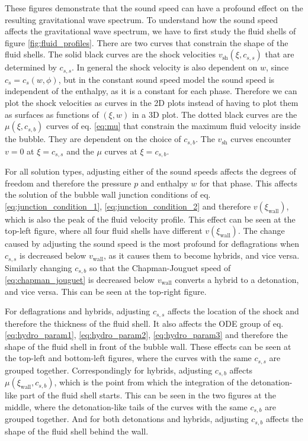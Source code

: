 These figures demonstrate that the sound speed can have a profound effect on the resulting gravitational wave spectrum.
To understand how the sound speed affects the gravitational wave spectrum,
we have to first study the fluid shells of figure \ref{fig:fluid_profiles}.
There are two curves that constrain the shape of the fluid shells.
The solid black curves are the shock velocities $v_\text{sh}(\xi,c_{s,s})$ that are determined by $c_{s,s}$.
In general the shock velocity is also dependent on $w$, since $c_s = c_s(w,\phi)$,
but in the constant sound speed model the sound speed is independent of the enthalpy,
as it is a constant for each phase.
Therefore we can plot the shock velocities as curves in the 2D plots instead of having to plot them as surfaces as functions of $(\xi,w)$ in a 3D plot.
The dotted black curves are the $\mu(\xi,c_{s,b})$ curves of eq. \eqref{eq:mu} that constrain the maximum fluid velocity inside the bubble.
They are dependent on the choice of $c_{s,b}$.
The $v_\text{sh}$ curves encounter $v=0$ at $\xi = c_{s,s}$ and the $\mu$ curves at $\xi = c_{s,b}$.

For all solution types, adjusting either of the sound speeds affects the degrees of freedom and therefore the pressure $p$ and enthalpy $w$ for that phase.
This affects the solution of the bubble wall junction conditions of eq. \eqref{eq:junction_condition_1}, \eqref{eq:junction_condition_2} and therefore $v(\xi_\text{wall})$,
which is also the peak of the fluid velocity profile.
This effect can be seen at the top-left figure, where all four fluid shells have different $v(\xi_\text{wall})$.
The change caused by adjusting the sound speed is the most profound for deflagrations when $c_{s,s}$ is decreased below $v_\text{wall}$, as it causes them to become hybrids, and vice versa.
Similarly changing $c_{s,b}$ so that the Chapman-Jouguet speed of \eqref{eq:chapman_jouguet} is decreased below $v_\text{wall}$ converts a hybrid to a detonation, and vice versa.
This can be seen at the top-right figure.

For deflagrations and hybrids, adjusting $c_{s,s}$ affects the location of the shock and therefore the thickness of the fluid shell.
It also affects the ODE group of eq. \eqref{eq:hydro_param1}, \eqref{eq:hydro_param2}, \eqref{eq:hydro_param3} and therefore the shape of the fluid shell in front of the bubble wall.
These effects can be seen at the top-left and bottom-left figures, where the curves with the same $c_{s,s}$ are grouped together.
Correspondingly for hybrids, adjusting $c_{s,b}$ affects $\mu(\xi_\text{wall},c_{s,b})$,
which is the point from which the integration of the detonation-like part of the fluid shell starts.
This can be seen in the two figures at the middle, where the detonation-like tails of the curves with the same $c_{s,b}$ are grouped together.
And for both detonations and hybrids, adjusting $c_{s,b}$ affects the shape of the fluid shell behind the wall.

